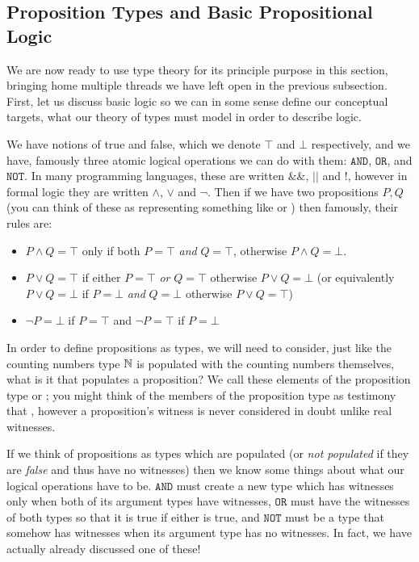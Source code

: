 \documentclass[11pt]{article}
\begin{document}
\subsection{Proposition Types and Basic Propositional Logic}

We are now ready to use type theory for its principle purpose in this section, bringing home multiple threads we have left open in the previous subsection. First, let us discuss basic logic so we can in some sense define our conceptual targets, what our theory of types must model in order to describe logic.

We have notions of true and false, which we denote $\top$ and $\bot$ respectively, and we have, famously three atomic logical operations we can do with them: $\mathtt{AND}$, $\mathtt{OR}$, and $\mathtt{NOT}$. In many programming languages, these are written $\mathtt{\&\&}$, $\mathtt{||}$ and $\mathtt{!}$, however in formal logic they are written $\wedge$, $\vee$ and $\neg$. Then if we have two propositions $P,Q$ (you can think of these as representing something like  or ) then famously, their rules are: \begin{itemize}
\item $P \wedge Q = \top$ only if both $P= \top$ \emph{and} $Q = \top$, otherwise $P \wedge Q = \bot$.
\item $P \vee Q = \top$ if either $P = \top$ \emph{or} $Q = \top$ otherwise $P \vee Q = \bot$ (or equivalently $P \vee Q = \bot$ if $P = \bot$ \emph{and} $Q = \bot$ otherwise $P \vee Q = \top$)
\item $\neg P = \bot$ if $P = \top $ and $\neg P = \top$ if $P = \bot$
\end{itemize}

In order to define propositions as types, we will need to consider, just like the counting numbers type $\mathbb{N}$ is populated with the counting numbers themselves, what is it that populates a proposition? We call these elements of the proposition type  or ; you might think of the members of the proposition type  as testimony that , however a proposition's witness is never considered in doubt unlike real witnesses.

If we think of propositions as types which are populated (or \emph{not populated} if they are \emph{false} and thus have no witnesses) then we know some things about what our logical operations have to be. $\mathtt{AND}$ must create a new type which has witnesses only when both of its argument types have witnesses, $\mathtt{OR}$ must have the witnesses of both types so that it is true if either is true, and $\mathtt{NOT}$ must be a type that somehow has witnesses when its argument type has no witnesses. In fact, we have actually already discussed one of these!
\end{document}
